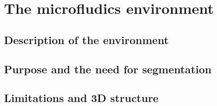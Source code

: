 
\chapter{The microfludics environment}

\ifpdf
    \graphicspath{{Chapter2/Figs/Raster/}{Chapter2/Figs/PDF/}{Chapter2/Figs/}}
\else
    \graphicspath{{Chapter2/Figs/Vector/}{Chapter2/Figs/}}
\fi

\section{Description of the environment}

\section{Purpose and the need for segmentation}

\section{Limitations and 3D structure}
